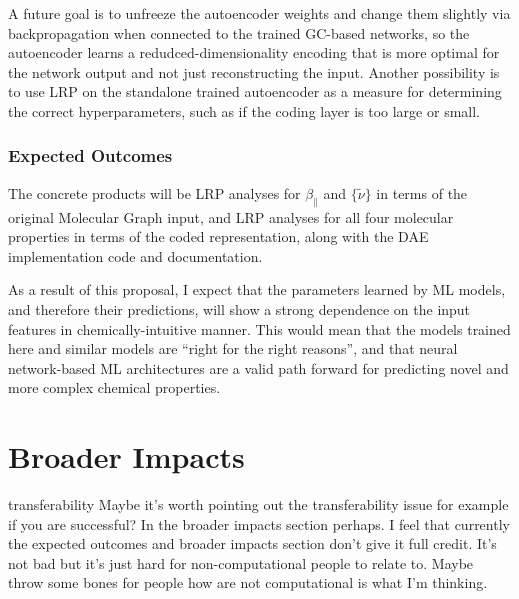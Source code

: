 \documentclass[12pt]{article}
\begin{document}
A future goal is to unfreeze the autoencoder weights and change them slightly via backpropagation when connected to the trained GC-based networks, so the autoencoder learns a redudced-dimensionality encoding that is more optimal for the network output and not just reconstructing the input. Another possibility is to use LRP on the standalone trained autoencoder as a measure for determining the correct hyperparameters, such as if the coding layer is too large or small.

\subsubsection{Expected Outcomes}
\label{sec:org1b10830}

The concrete products will be LRP analyses for \(\beta_{\parallel}\) and \(\{\tilde{\nu}\}\) in terms of the original Molecular Graph input, and LRP analyses for all four molecular properties in terms of the coded representation, along with the DAE implementation code and documentation.


As a result of this proposal, I expect that the parameters learned by ML models, and therefore their predictions, will show a strong dependence on the input features in chemically-intuitive manner. This would mean that the models trained here and similar models are ``right for the right reasons'', and that neural network-based ML architectures are a valid path forward for predicting novel and more complex chemical properties.

\section{Broader Impacts}
\label{sec:org4e84379}

\begin{anfxnote}{transferability}
Maybe it's worth pointing out the transferability issue for example if you are successful? In the broader impacts section perhaps. I feel that currently the expected outcomes and broader impacts section don't give it full credit. It's not bad but it's just hard for non-computational people to relate to. Maybe throw some bones for people how are not computational is what I'm thinking.
\end{anfxnote}
\end{document}
